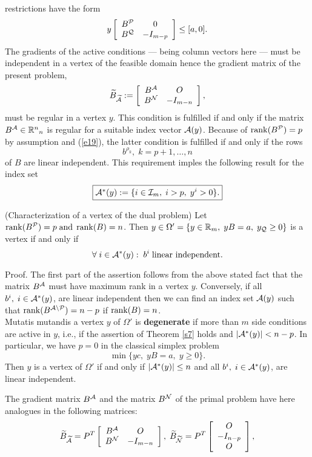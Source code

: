 restrictions  have the form
\[
y\ba{[}{ccc} B^{\P} &        0           \\
                 B^{\Q} & -I_{m-p}       \\
\ea{]}  \leq [a,0].
\]
The gradients of the active conditions --- being column vectors here --- must
be independent in a vertex of the feasible domain hence the gradient
matrix of the present problem,
\[
\wi{B}_{\wi{\A}} := \ba{[}{cc} B^{\A}        &    O        \\
                          B^{\N}   &    - I_{m-n} \ea{]},
\]
must be regular in a vertex $y$.  This condition is fulfilled if and only if
the matrix $B^{\A} \in \Bbb{R}^n{}_n$ is regular for a suitable index vector
$\A(y)$.  Because of $\rank (B^{\P}) = p$ by assumption and (\ref{e19}), the
latter condition is fulfilled if and only if the rows
\[
b^{\rho _k}, \; k = p+1, \ldots, n
\]
of $B$ are linear independent. This requirement imples the following result
for the index set
\[
\fbox{$
\A^*(y) := \{i \in \I_m, \; i > p, \; y^i >0\}.
$}
\]
%
\begin{theorem} \label{s7} (Characterization of a vertex of the dual
problem) Let $\rank (B^{\P}) = p \; \mbox{and} \; \rank (B) = n$.
Then $y \in \Omega' = \{ y \in \Bbb{R}_m, \; yB = a, \;
y_{\Q} \geq 0\}$ is a vertex if and only if
\[
\forall \; i \in \A^*(y): \; b^i \; \mbox{linear independent}.
\]
\end{theorem}
%
Proof.  The first part of the assertion follows from the above stated fact that
the matrix $B^{\A}$ must have maximum rank in a vertex $y$.  Conversely,
if all $b^i, \; i \in \A^*(y)$, are linear independent then we can find an
index set $\A(y)$ such that $\rank (B^{\A \backslash \P}) = n - p$ if $\rank
(B) = n$.\\
%
Mutatis mutandis a vertex $y$ of $\Omega '$ is {\bf degenerate} if more than
$m$ side conditions are active in $y$, i.e., if the assertion of Theorem
\ref{s7} holds and $|\A^*(y)| < n - p$.  In particular, we have $p = 0$ in the
classical simplex problem
\[
\min \{yc, \; yB = a, \; y \geq 0\}.
\]
Then $y$ is a vertex of $\Omega '$ if and only if $|\A^*(y)| \leq n$ and all
$b^i, \; i \in \A^*(y)$, are linear independent.
\par
%
The gradient matrix $B^{\A}$ and the matrix $B^{\N}$ of the primal problem
have here analogues in the following matrices:
\begin{equation} \label{bab}
\wi{B}_{\wi{\A}} = P^T\ba{[}{cc}  B^{\A} & O \\ B^{\N} & - I_{m-n}\ea{]},
\; \wi{B}_{\wi{\N}} = P^T\ba{[}{c}O \\-I_{n-p} \\ O \ea{]},
\end{equation}

